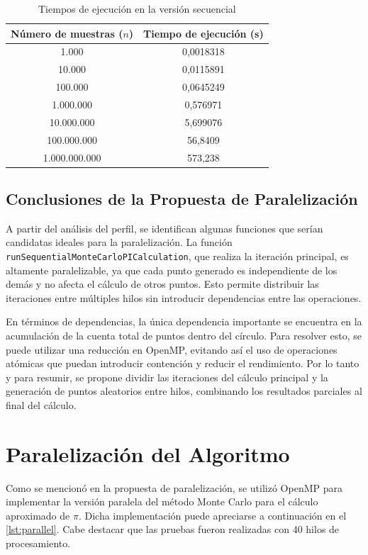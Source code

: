 \documentclass[a4paper, 10pt, onecolumn]{IEEEtran}
\begin{document}
\begin{table}[H]
  \centering
  \begin{tabular}{|c|c|}
    \hline
    \textbf{Número de muestras ($n$)} & \textbf{Tiempo de ejecución (s)} \\
    \hline
    1.000         & 0,0018318 \\
    10.000        & 0,0115891 \\
    100.000       & 0,0645249 \\
    1.000.000     & 0,576971 \\
    10.000.000    & 5,699076 \\
    100.000.000   & 56,8409 \\
    1.000.000.000 & 573,238 \\
    \hline
  \end{tabular}
  \caption{Tiempos de ejecución en la versión secuencial}
  \label{tab:sequential_execution_times}
\end{table}

\subsection{Conclusiones de la Propuesta de Paralelización}
A partir del análisis del perfil, se identifican algunas funciones que serían candidatas ideales para la paralelización. La función \texttt{runSequentialMonteCarloPICalculation}, que realiza la iteración principal, es altamente paralelizable, ya que cada punto generado es independiente de los demás y no afecta el cálculo de otros puntos. Esto permite distribuir las iteraciones entre múltiples hilos sin introducir dependencias entre las operaciones.

En términos de dependencias, la única dependencia importante se encuentra en la acumulación de la cuenta total de puntos dentro del círculo. Para resolver esto, se puede utilizar una reducción en OpenMP, evitando así el uso de operaciones atómicas que puedan introducir contención y reducir el rendimiento. Por lo tanto y para resumir, se propone dividir las iteraciones del cálculo principal y la generación de puntos aleatorios entre hilos, combinando los resultados parciales al final del cálculo.

\section{Paralelización del Algoritmo}
Como se mencionó en la propuesta de paralelización, se utilizó OpenMP para implementar la versión paralela del método Monte Carlo para el cálculo aproximado de $\pi$. Dicha implementación puede apreciarse a continuación en el \cref{lst:parallel}. Cabe destacar que las pruebas fueron realizadas con 40 hilos de procesamiento.
\end{document}
